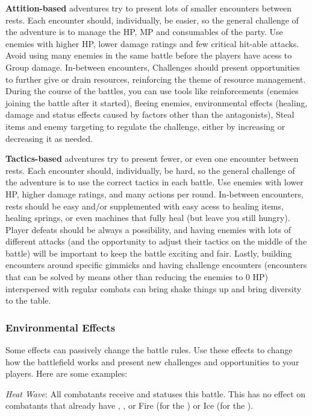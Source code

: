 \begin{multicols}{2}
\textbf{Attition-based} adventures try to present lots of smaller encounters between rests. Each encounter should, individually, be easier, so the general challenge of the adventure is to manage the HP, MP and consumables of the party. Use enemies with higher HP, lower damage ratings and few critical hit-able attacks. Avoid using many enemies in the same battle before the players have acess to Group damage. In-between encounters, Challenges should present opportunities to further give or drain resources, reinforcing the theme of resource management. During the course of the battles, you can use tools like reinforcements (enemies joining the battle after it started), fleeing enemies, environmental effects (healing, damage and status effects caused by factors other than the antagonists), Steal items and enemy targeting to regulate the challenge, either by increasing or decreasing it as needed.

\textbf{Tactics-based} adventures try to present fewer, or even one encounter between rests. Each encounter should, individually, be hard, so the general challenge of the adventure is to use the correct tactics in each battle. Use enemies with lower HP, higher damage ratings, and many actions per round. In-between encounters, rests should be easy and/or supplemented with easy acess to healing items, healing springs, or even machines that fully heal (but leave you still hungry). Player defeats should be always a possibility, and having enemies with lots of different attacks (and the opportunity to adjust their tactics on the middle of the battle) will be important to keep the battle exciting and fair. Lastly, building encounters around specific gimmicks and having challenge encounters (encounters that can be solved by means other than reducing the enemies to 0 HP) interspersed with regular combats can bring shake things up and bring diversity to the table.  

\subsubsection{Environmental Effects}\label{gm-enveffct}
Some effects can passively change the battle rules. Use these effects to change how the battlefield works and present new challenges and opportunities to your players. Here are some examples:

\textit{Heat Wave}: All combatants receive  and  statuses this battle. This has no effect on combatants that already have , ,  or  Fire (for the ) or Ice (for the ). 


\end{multicols}
